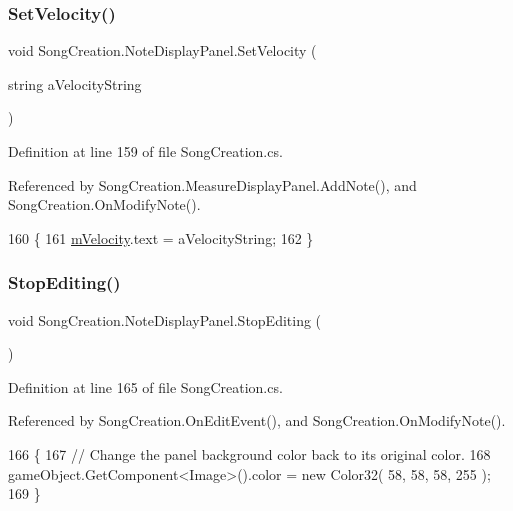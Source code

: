 \subsubsection{\texorpdfstring{Set\+Velocity()}{SetVelocity()}}
{\footnotesize\ttfamily void Song\+Creation.\+Note\+Display\+Panel.\+Set\+Velocity (\begin{DoxyParamCaption}\item[{string}]{a\+Velocity\+String }\end{DoxyParamCaption})}



Definition at line 159 of file Song\+Creation.\+cs.



Referenced by Song\+Creation.\+Measure\+Display\+Panel.\+Add\+Note(), and Song\+Creation.\+On\+Modify\+Note().


\begin{DoxyCode}
160         \{
161             \hyperlink{class_song_creation_1_1_note_display_panel_a3e9bb032c809e27c4ce277c532e4ff66}{mVelocity}.text = aVelocityString;
162         \}
\end{DoxyCode}
\mbox{\label{class_song_creation_1_1_note_display_panel_a75afc179723dc73d1f7715808f453dd1}} 
\subsubsection{\texorpdfstring{Stop\+Editing()}{StopEditing()}}
{\footnotesize\ttfamily void Song\+Creation.\+Note\+Display\+Panel.\+Stop\+Editing (\begin{DoxyParamCaption}{ }\end{DoxyParamCaption})}



Definition at line 165 of file Song\+Creation.\+cs.



Referenced by Song\+Creation.\+On\+Edit\+Event(), and Song\+Creation.\+On\+Modify\+Note().


\begin{DoxyCode}
166         \{
167             \textcolor{comment}{// Change the panel background color back to its original color.}
168             gameObject.GetComponent<Image>().color = \textcolor{keyword}{new} Color32( 58, 58, 58, 255 );
169         \}
\end{DoxyCode}
\mbox{\label{class_song_creation_1_1_note_display_panel_a56b230f3141d57f1c11dd342b352eaa3}} 

